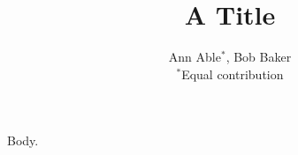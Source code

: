 \documentclass{article}
\begin{document}
\title{A Title}
\author{Ann Able$^*$, Bob Baker\\ $^*$Equal contribution}
\maketitle
Body.
\end{document}
